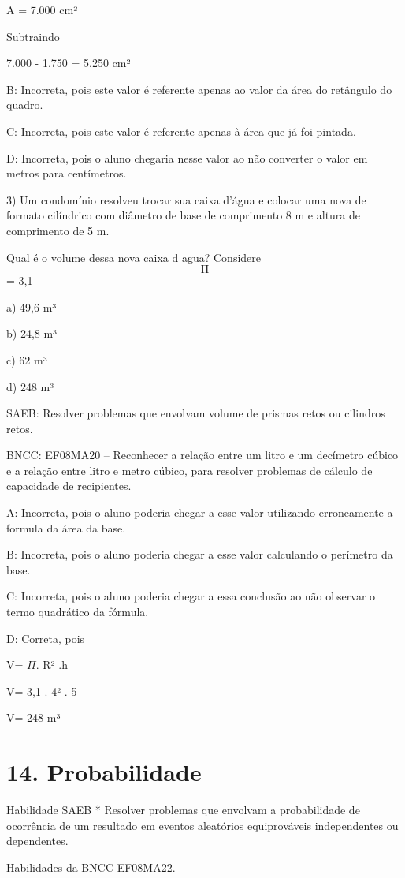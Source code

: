 A = 7.000 cm²

Subtraindo

7.000 - 1.750 = 5.250 cm²

B: Incorreta, pois este valor é referente apenas ao valor da área do
retângulo do quadro.

C: Incorreta, pois este valor é referente apenas à área que já foi
pintada.

D: Incorreta, pois o aluno chegaria nesse valor ao não converter o valor
em metros para centímetros.

3) Um condomínio resolveu trocar sua caixa d'água e colocar uma nova de
formato cilíndrico com diâmetro de base de comprimento 8 m e altura de
comprimento de 5 m.

Qual é o volume dessa nova caixa d agua? Considere \[\text{Π}\] = 3,1

a) 49,6 m³

b) 24,8 m³

c) 62 m³

d) 248 m³

SAEB: Resolver problemas que envolvam volume de prismas retos ou
cilindros retos.

BNCC: EF08MA20 -- Reconhecer a relação entre um litro e um decímetro
cúbico e a relação entre litro e metro cúbico, para resolver problemas
de cálculo de capacidade de recipientes.

A: Incorreta, pois o aluno poderia chegar a esse valor utilizando
erroneamente a formula da área da base.

B: Incorreta, pois o aluno poderia chegar a esse valor calculando o
perímetro da base.

C: Incorreta, pois o aluno poderia chegar a essa conclusão ao não
observar o termo quadrático da fórmula.

D: Correta, pois

V= \(\Pi\). R² .h

V= 3,1 . 4² . 5

V= 248 m³

\hypertarget{probabilidade}{%
\section{14. Probabilidade}\label{probabilidade}}

Habilidade SAEB * Resolver problemas que envolvam a probabilidade de
ocorrência de um resultado em eventos aleatórios equiprováveis
independentes ou dependentes.

Habilidades da BNCC EF08MA22.

